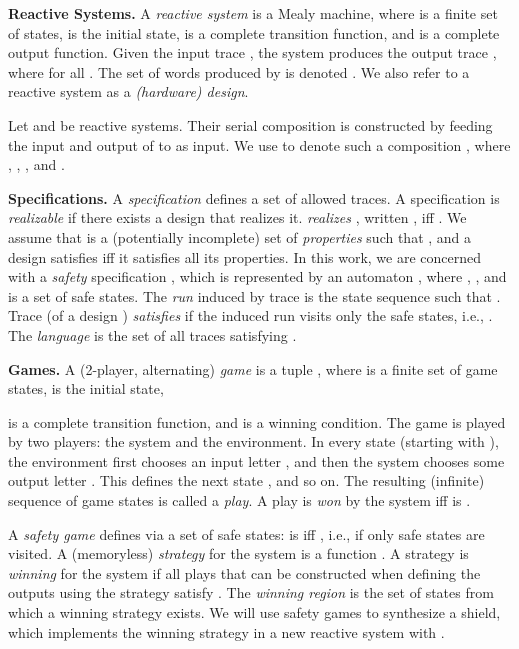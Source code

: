 \documentclass{llncs}
\begin{document}
\noindent
\textbf{Reactive Systems.}
A \emph{reactive system}  is a Mealy machine, where  is a 
finite set of states,  is the initial state,  is a complete transition 
function, and  
is a complete output function.  Given the input trace , the system  produces the 
output trace , where  for all .  The set of words produced by 
 is denoted .  We also refer to 
a reactive system  as a \emph{(hardware) design}.

Let  
and  be reactive systems.  Their serial composition is constructed 
by feeding the input and output of  to  as input.  We 
use  to denote such a composition 
, where
, 
,
, and
.   

\noindent
\textbf{Specifications.}
A \emph{specification}  defines a set  of allowed traces.  A specification  is 
\emph{realizable} if there exists a design  that realizes it. 
 \emph{realizes} , written , iff 
.
We assume that  is a (potentially incomplete) set of 
\emph{properties}  such that , and a design satisfies  iff it 
satisfies all its properties.
In this work, we are concerned with a \emph{safety} specification 
, which is represented by an automaton , where , 
, and  is a set of safe states.  The \emph{run} induced by trace 
 is the state 
sequence  such that .  Trace  (of a design ) 
\emph{satisfies}  if the induced run visits only the safe 
states, i.e., .  The \emph{language} 
 is the set of all traces satisfying .  


\noindent
\textbf{Games.}
A (2-player, alternating) \emph{game} is a tuple , where  is a 
finite set of game states,  is the initial state, 
 
is a complete transition function, and  is a winning condition.  The game is played by two 
players: the system and the environment.  In every state  
(starting with ), the environment first chooses an input letter 
, and then the system chooses some output 
letter . This defines the next state , and so on. The resulting (infinite) 
sequence  of game states is called a 
\emph{play}.  A play is \emph{won} by the system iff 
 is .

A \emph{safety game} defines  via a set  of 
safe states:  is  iff , i.e., if only safe states are visited.
A (memoryless) \emph{strategy} for the system is a function . A strategy is 
\emph{winning} for the system if all plays  that can be 
constructed when defining the outputs using the strategy satisfy 
. The \emph{winning region} is the set of states 
from which a winning strategy exists. We will use safety games to 
synthesize a shield, which implements the winning strategy in a new 
reactive system  with .
\end{document}
